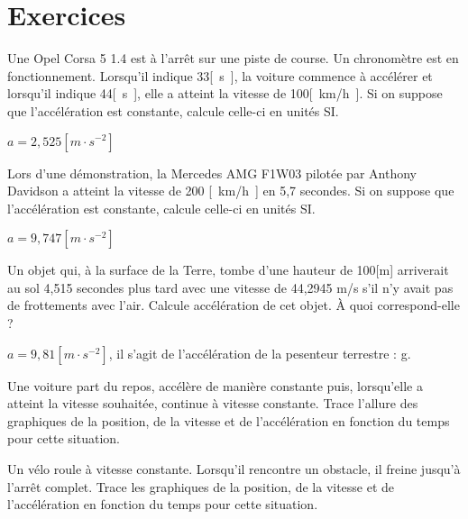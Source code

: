\section{Exercices}
\begin{exercise}
  Une Opel Corsa 5 1.4 est à l'arrêt sur une piste de course. Un chronomètre est en fonctionnement. Lorsqu'il indique 33\unit{[s]}, la voiture commence à accélérer et lorsqu'il indique 44\unit{[s]}, elle a atteint la vitesse de 100\unit{[km/h]}. Si on suppose que l'accélération est constante, calcule celle-ci en unités SI.
\end{exercise}
\begin{solution}
  \(a=2,525\unit{[m \cdot s^{-2}]}\)
\end{solution}
\begin{exercise}
  Lors d'une démonstration, la Mercedes AMG F1W03 pilotée par Anthony Davidson a atteint la vitesse de 200 \unit{[km/h]} en 5,7 secondes. Si on suppose que l'accélération est constante, calcule celle-ci en unités SI.
\end{exercise}
\begin{solution}
  \(a=9,747\unit{[m \cdot s^{-2}]}\)
\end{solution}

\begin{exercise}
  Un objet qui, à la surface de la Terre, tombe d'une hauteur de 100[m] arriverait au sol 4,515 secondes plus tard avec une vitesse de 44,2945 m/s s'il n'y avait pas de frottements avec l'air. Calcule accélération de cet objet. À quoi correspond-elle ?
\end{exercise}
\begin{solution}
  \(a=9,81\unit{[m \cdot s^{-2}]}\), il s'agit de l'accélération de la pesenteur terrestre : g.
\end{solution}

\begin{exercise}
  Une voiture part du repos, accélère de manière constante puis, lorsqu'elle a atteint la vitesse souhaitée, continue à vitesse constante.
  Trace l'allure des graphiques de la position, de la vitesse et de l'accélération en fonction du temps pour cette situation.
\end{exercise}

\begin{exercise}
  Un vélo roule à vitesse constante. Lorsqu'il rencontre un obstacle, il freine jusqu'à l'arrêt complet.
  Trace les graphiques de la position, de la vitesse et de l'accélération en fonction du temps pour cette situation.
\end{exercise}

